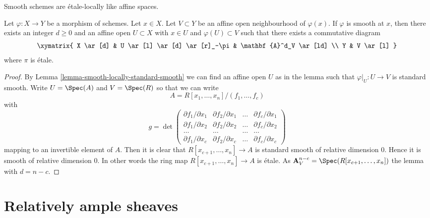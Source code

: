\begin{lemma}
\label{lemma-smooth-etale-over-affine-space}
\begin{slogan}
Smooth schemes are \'etale-locally like affine spaces.
\end{slogan}
Let $\varphi : X \to Y$ be a morphism of schemes. Let $x \in X$.
Let $V \subset Y$ be an affine open neighbourhood of $\varphi(x)$.
If $\varphi$ is smooth at $x$, then there exists an integer $d \geq 0$
and an affine open $U \subset X$ with $x \in U$ and
$\varphi(U) \subset V$ such that there exists a commutative diagram
$$
\xymatrix{
X \ar[d] & U \ar[l] \ar[d] \ar[r]_-\pi & \mathbf{A}^d_V \ar[ld] \\
Y & V \ar[l]
}
$$
where $\pi$ is \'etale.
\end{lemma}

\begin{proof}
By
Lemma \ref{lemma-smooth-locally-standard-smooth}
we can find an affine open $U$ as in the lemma such that
$\varphi|_U : U \to V$ is standard smooth. Write
$U = \Spec(A)$ and $V = \Spec(R)$ so that we can write
$$
A = R[x_1, \ldots, x_n]/(f_1, \ldots, f_c)
$$
with
$$
g =
\det
\left(
\begin{matrix}
\partial f_1/\partial x_1 &
\partial f_2/\partial x_1 &
\ldots &
\partial f_c/\partial x_1 \\
\partial f_1/\partial x_2 &
\partial f_2/\partial x_2 &
\ldots &
\partial f_c/\partial x_2 \\
\ldots & \ldots & \ldots & \ldots \\
\partial f_1/\partial x_c &
\partial f_2/\partial x_c &
\ldots &
\partial f_c/\partial x_c
\end{matrix}
\right)
$$
mapping to an invertible element of $A$. Then it is clear that
$R[x_{c + 1}, \ldots, x_n] \to A$ is standard smooth of relative
dimension $0$. Hence it is smooth of relative dimension $0$.
In other words the ring map $R[x_{c + 1}, \ldots, x_n] \to A$
is \'etale. As $\mathbf{A}^{n - c}_V = \Spec(R[x_{c + 1}, \ldots, x_n])$
the lemma with $d = n - c$.
\end{proof}
















\section{Relatively ample sheaves}
\label{section-relatively-ample}

